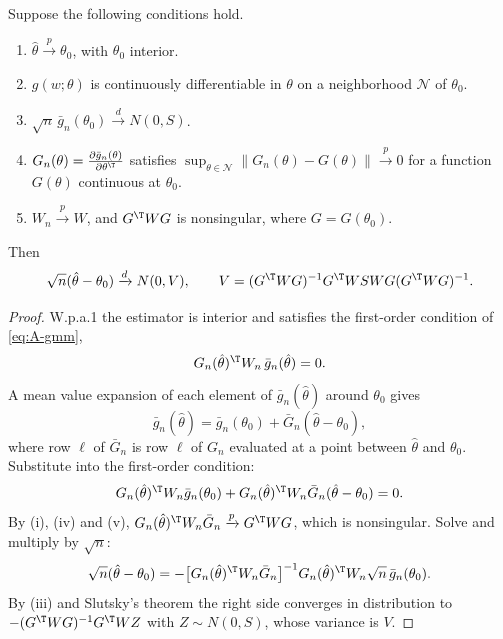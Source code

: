 \begin{theorem}\label{thm:A-gmm-normal}
Suppose the following conditions hold.
\begin{enumerate}[label=(\roman*)]
  \item $\hat\theta \xrightarrow{p} \theta_0$, with $\theta_0$ interior.
  \item $g(w;\theta)$ is continuously differentiable in $\theta$ on a neighborhood $\mathcal{N}$ of $\theta_0$.
  \item $\sqrt{n}\,\bar g_n(\theta_0) \xrightarrow{d} N(0, S)$.
  \item $G_n(\theta) = \frac{\partial\bar g_n(\theta)}{\partial\theta^\T}$ satisfies $\sup_{\theta \in \mathcal{N}}\lVert
  G_n(\theta) - G(\theta)\rVert \xrightarrow{p} 0$ for a function $G(\theta)$ continuous at $\theta_0$.
  \item $W_n \xrightarrow{p} W$, and $G^\T WG$ is nonsingular, where $G = G(\theta_0)$.
\end{enumerate}
Then
\begin{equation}\label{eq:A-gmm-var}
  \sqrt{n}(\hat\theta - \theta_0) \xrightarrow{d} N(0, V), \qquad
  V = (G^\T WG)^{-1}G^\T WSWG(G^\T WG)^{-1}.
\end{equation}
\end{theorem}

\begin{proof}
W.p.a.1 the estimator is interior and satisfies the first-order condition of \eqref{eq:A-gmm},
\begin{equation*}
  G_n(\hat\theta)^\T W_n\,\bar g_n(\hat\theta) = 0.
\end{equation*}
A mean value expansion of each element of $\bar g_n(\hat\theta)$ around $\theta_0$ gives
\begin{equation*}
  \bar g_n(\hat\theta) = \bar g_n(\theta_0) + \bar G_n(\hat\theta - \theta_0),
\end{equation*}
where row $\ell$ of $\bar G_n$ is row $\ell$ of $G_n$ evaluated at a point between $\hat\theta$ and $\theta_0$. Substitute
into the first-order condition:
\begin{equation*}
  G_n(\hat\theta)^\T W_n\bar g_n(\theta_0) + G_n(\hat\theta)^\T W_n\bar G_n(\hat\theta - \theta_0) = 0.
\end{equation*}
By (i), (iv) and (v), $G_n(\hat\theta)^\T W_n\bar G_n \xrightarrow{p} G^\T WG$, which is nonsingular. Solve and multiply by
$\sqrt{n}$:
\begin{equation*}
  \sqrt{n}(\hat\theta - \theta_0) = -\big[G_n(\hat\theta)^\T W_n\bar G_n\big]^{-1}G_n(\hat\theta)^\T W_n\sqrt{n}\,\bar
  g_n(\theta_0).
\end{equation*}
By (iii) and Slutsky's theorem the right side converges in distribution to $-(G^\T WG)^{-1}G^\T WZ$ with $Z \sim N(0, S)$,
whose variance is $V$.
\end{proof}

